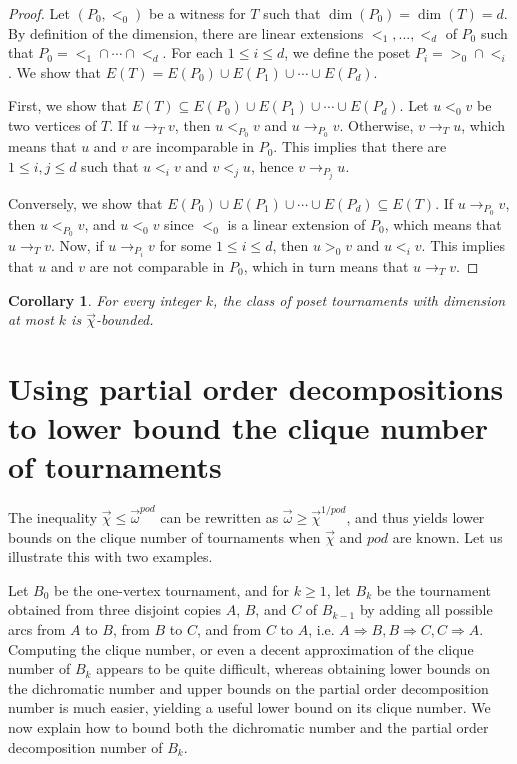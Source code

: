 \documentclass{article}
\newcommand{\dic}{\vec\chi}
\newcommand{\diomega}{\vec\omega}
\renewcommand{\le}{\leqslant}
\newtheorem{corollary}[lemma]{Corollary}
\begin{document}
\begin{proof}
    Let $(P_0,<_0)$ be a witness for $T$ such that $\dim(P_0)=\dim(T)=d$. By definition of the dimension, there are linear extensions $<_1, ..., <_d$ of $P_0$ such that $P_0 = {} <_1 \cap \cdots \cap <_d$. For each $1 \le i \le d$, we define the poset $P_i = {} >_0 \cap <_i$. We show that $E(T) = E(P_0) \cup E(P_1) \cup \cdots \cup E(P_d)$.

    First, we show that $E(T) \subseteq E(P_0) \cup E(P_1) \cup \cdots \cup E(P_d)$. Let $u <_0 v$ be two vertices of $T$.
    If $u \to_T v$, then $u <_{P_0} v$ and $u \to_{P_0} v$.
    Otherwise, $v \to_T u$, which means that $u$ and $v$ are incomparable in $P_0$. This implies that there are $1 \le i, j \le d$ such that $u <_i v$ and $v <_j u$, hence $v \to_{P_j} u$.
    
    Conversely, we show that $E(P_0) \cup E(P_1) \cup \cdots \cup E(P_d) \subseteq E(T)$.
    If $u \to_{P_0} v$, then $u <_{P_0} v$, and $u <_0 v$ since $<_0$ is a linear extension of $P_0$, which means that $u \to_T v$.
    Now, if $u \to_{P_i} v$ for some $1 \le i \le d$, then $u >_0 v$ and $u <_i v$. This implies that $u$ and $v$ are not comparable in $P_0$, which in turn means that $u \to_T v$.
\end{proof}



\begin{corollary}
    For every integer $k$, the class of poset tournaments with dimension at most $k$ is $\dic$-bounded.
\end{corollary}



\section{Using partial order decompositions to lower bound the clique number of tournaments}\label{sec:lower_bound}

The inequality $\dic \leq \diomega^{pod}$ can  be rewritten as $\diomega \geq \dic^{1/pod}$, and thus yields lower bounds on the clique number of tournaments when $\dic$ and $pod$ are known. Let us illustrate this with  two examples. 

Let $B_0$ be the one-vertex tournament, and for $k \geq 1$, let $B_k$ be the tournament obtained from three disjoint copies $A$, $B$, and $C$ of $B_{k-1}$ by adding all possible arcs from $A$ to $B$, from $B$ to $C$, and from $C$ to $A$, i.e. $A \Rightarrow B, B \Rightarrow C, C \Rightarrow A$. 
Computing the clique number, or even a decent approximation of the clique number of $B_k$ appears to be quite difficult, whereas obtaining lower bounds on the dichromatic number and upper bounds on the partial order decomposition number is much easier, yielding a useful lower bound on its clique number. We now explain how to bound both the dichromatic number and the partial order decomposition number of $B_k$. 
\end{document}
